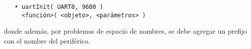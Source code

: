 \begin{verbatim}
   • uartInit( UART0, 9600 )
     <función>( <objeto>, <parámetros> )
\end{verbatim}

donde además, por problemas de espacio de nombres, se debe agregar un prefijo con el nombre del periférico.
















